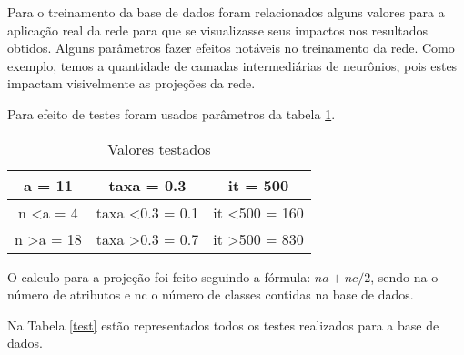 \documentclass[
	article,			%
	11pt,				%
	oneside,			%
	a4paper,			%
	english,			%
	brazil,				%
	sumario=tradicional
	]{abntex2}
\begin{document}
Para o treinamento da base de dados foram relacionados alguns valores para a aplicação real da rede para que se visualizasse seus impactos nos resultados obtidos. Alguns parâmetros fazer efeitos notáveis no treinamento da rede. Como exemplo, temos a quantidade de camadas intermediárias de neurônios, pois estes impactam visivelmente as projeções da rede. 

Para efeito de testes foram usados parâmetros da tabela \ref{val}.

\begin{table}[h]
	\centering
	\caption{Valores testados}
	\label{val}
	\begin{tabular}{|c|c|c|}
		\hline
		a = 11                & taxa = 0.3                  & it = 500                  \\ \hline
		n \textless a = 4     & taxa \textless 0.3 = 0.1    & it \textless 500 = 160    \\ \hline
		n \textgreater a = 18 & taxa \textgreater 0.3 = 0.7 & it \textgreater 500 = 830 \\ \hline
	\end{tabular}
\end{table}

O calculo para a projeção foi feito seguindo a fórmula: $na + nc/2$, sendo na o número de atributos e nc o número de classes contidas na base de dados.

Na Tabela \ref{test} estão representados todos os testes realizados para a base de dados.
\end{document}
